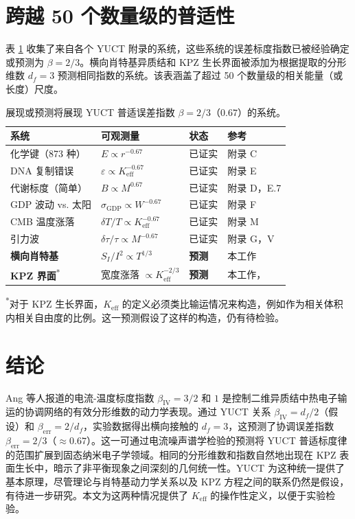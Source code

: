 \documentclass[12pt,a4paper]{article}
\newcommand{\Keff}{K_{\mathrm{eff}}}
\begin{document}
	\section{跨越 50 个数量级的普适性}
	表 \ref{tab:universal-beta} 收集了来自各个 YUCT 附录的系统，这些系统的误差标度指数已被经验确定或预测为 $\beta = 2/3$。横向肖特基异质结和 KPZ 生长界面被添加为根据提取的分形维数 $d_f = 3$ 预测相同指数的系统。该表涵盖了超过 50 个数量级的相关能量（或长度）尺度。
	
	\begin{table}[H]
		\centering
		\caption{展现或预测将展现 YUCT 普适误差指数 $\beta = 2/3$（$0.67$）的系统。}
		\label{tab:universal-beta}
		\begin{tabular}{@{}llll@{}}
			\toprule
			\textbf{系统} & \textbf{可观测量} & \textbf{状态} & \textbf{参考} \\
			\midrule
			化学键（873 种）      & $E \propto r^{-0.67}$               & 已证实  & 附录 C \\
			DNA 复制错误    & $\varepsilon \propto \Keff^{-0.67}$ & 已证实  & 附录 E \\
			代谢标度（简单）& $B \propto M^{0.67}$               & 已证实  & 附录 D，E.7 \\
			GDP 波动 vs. 太阳   & $\sigma_{\mathrm{GDP}} \propto W^{-0.67}$ & 已证实 & 附录 F \\
			CMB 温度涨落    & $\delta T/T \propto \Keff^{-0.67}$ & 已证实  & 附录 M \\
			引力波       & $\delta\tau/\tau \propto M^{-0.67}$& 已证实  & 附录 G，V \\
			\textbf{横向肖特基} & $S_I/I^2 \propto T^{1/3}$          & \textbf{预测} & 本工作 \\
			\textbf{KPZ 界面}\textsuperscript{*} & 宽度涨落 $\propto \Keff^{-2/3}$& \textbf{预测} & 本工作，\cite{KPZ}\\
			\bottomrule
		\end{tabular}
		
		\vspace{0.3cm}
		{\footnotesize \textsuperscript{*}对于 KPZ 生长界面，$K_{\mathrm{eff}}$ 的定义必须类比输运情况来构造，例如作为相关体积内相关自由度的比例。这一预测假设了这样的构造，仍有待检验。}
	\end{table}
	
	\section{结论}
	Ang 等人报道的电流-温度标度指数 $\beta_{\mathrm{IV}} = 3/2$ 和 $1$ 是控制二维异质结中热电子输运的协调网络的有效分形维数的动力学表现。通过 YUCT 关系 $\beta_{\mathrm{IV}} = d_f/2$（假设）和 $\beta_{\mathrm{err}} = 2/d_f$，实验数据得出横向接触的 $d_f = 3$，这预测了协调误差指数 $\beta_{\mathrm{err}} = 2/3$（$\approx 0.67$）。这一可通过电流噪声谱学检验的预测将 YUCT 普适标度律的范围扩展到固态纳米电子学领域。相同的分形维数和指数自然地出现在 KPZ 表面生长中，暗示了非平衡现象之间深刻的几何统一性。YUCT 为这种统一提供了基本原理，尽管理论与肖特基动力学关系以及 KPZ 方程之间的联系仍然是假设，有待进一步研究。本文为这两种情况提供了 $\Keff$ 的操作性定义，以便于实验检验。
	
\end{document}
